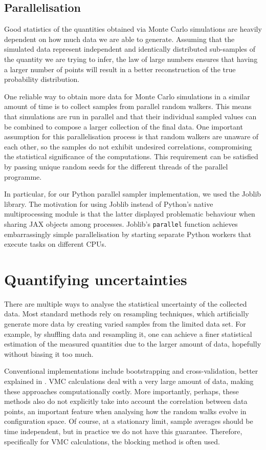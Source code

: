 \subsection{Parallelisation}\label{sec:parallel}

Good statistics of the quantities obtained via Monte Carlo simulations are heavily dependent on how much data we are able to generate. Assuming that the simulated data represent independent and identically distributed sub-samples of the quantity we are trying to infer, the law of large numbers ensures that having a larger number of points will result in a better reconstruction of the true probability distribution.

One reliable way to obtain more data for Monte Carlo simulations in a similar amount of time is to collect samples from parallel random walkers. This means that simulations are run in parallel and that their individual sampled values can be combined to compose a larger collection of the final data. One important assumption for this parallelisation process is that random walkers are unaware of each other, so the samples do not exhibit undesired correlations, compromising the statistical significance of the computations. This requirement can be satisfied by passing unique random seeds for the different threads of the parallel programme. 

In particular, for our Python parallel sampler implementation, we used the Joblib \cite{joblib} library. The motivation for using Joblib instead of Python's native multiprocessing module is that the latter displayed problematic behaviour when sharing JAX objects among processes. Joblib's \verb|parallel| function achieves embarrassingly simple parallelisation by starting separate Python workers that execute tasks on different CPUs.


\section{Quantifying uncertainties}\label{sec:blocking}
There are multiple ways to analyse the statistical uncertainty of the collected data. Most standard methods rely on resampling techniques, which artificially generate more data by creating varied samples from the limited data set. For example, by shuffling data and resampling it, one can achieve a finer statistical estimation of the measured quantities due to the larger amount of data, hopefully without biasing it too much.

Conventional implementations include bootstrapping and cross-validation, better explained in \cite{hastie2009elements}. VMC calculations deal with a very large amount of data, making these approaches computationally costly. More importantly, perhaps, these methods also do not explicitly take into account the correlation between data points, an important feature when analysing how the random walks evolve in configuration space. Of course, at a stationary limit, sample averages should be time independent, but in practice we do not have this guarantee. Therefore, specifically for VMC calculations, the blocking method is often used. 
 
